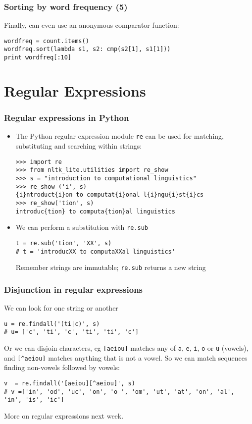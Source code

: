 \begin{frame}[fragile]
  \frametitle{Sorting by word frequency (5)}

  Finally, can even use an anonymous comparator function:
\begin{verbatim}
wordfreq = count.items()
wordfreq.sort(lambda s1, s2: cmp(s2[1], s1[1]))
print wordfreq[:10]
\end{verbatim}
\end{frame}

\section{Regular Expressions}

\begin{frame}[fragile]
  \frametitle{Regular expressions in Python}

  \begin{itemize}
  \item<1->  The Python regular expression module \texttt{re} can be used
    for matching, substituting and searching within strings:
{\small
\begin{verbatim}
>>> import re
>>> from nltk_lite.utilities import re_show
>>> s = "introduction to computational linguistics"
>>> re_show ('i', s)
{i}ntroduct{i}on to computat{i}onal l{i}ngu{i}st{i}cs
>>> re_show('tion', s)
introduc{tion} to computa{tion}al linguistics
\end{verbatim}}
  \item<2-> We can perform a substitution with \texttt{re.sub}
{\small
\begin{verbatim}
t = re.sub('tion', 'XX', s)
# t = 'introducXX to computaXXal linguistics'
\end{verbatim}}
    Remember strings are immutable; \texttt{re.sub} returns a new string
  \end{itemize}
\end{frame}

\begin{frame}[fragile]
  \frametitle{Disjunction in regular expressions}

  We can look for one string or another
{\small
\begin{verbatim}
u = re.findall('(ti|c)', s)
# u= ['c', 'ti', 'c', 'ti', 'ti', 'c']
\end{verbatim}}

  \pause
  Or we can disjoin characters, eg \texttt{[aeiou]} matches any of
  \texttt{a}, \texttt{e}, \texttt{i}, \texttt{o} or \texttt{u}
  (vowels), and \verb+[^aeiou]+ matches anything that is not a
  vowel.  So we can match sequences finding non-vowels followed by
  vowels:
{\small
\begin{verbatim}
v  = re.findall('[aeiou][^aeiou]', s)
# v =['in', 'od', 'uc', 'on', 'o ', 'om', 'ut', 'at', 'on', 'al', 'in', 'is', 'ic']
\end{verbatim}}

  More on regular expressions next week.
\end{frame}

